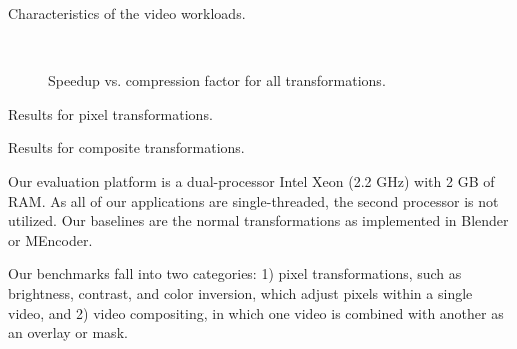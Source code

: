 \begin{table*}[t]

\vspace{-10pt}
\caption{Characteristics of the video workloads.
\protect\label{tab:videos}}
\vspace{6pt}
\end{table*}

\begin{figure}[t]
\begin{center}
\mbox{~}

\vspace{-10pt}
\caption{Speedup vs. compression factor for all transformations.
\protect\label{fig:speedup-scatter}}
\vspace{-12pt}
\end{center}
\end{figure}

\begin{table*}[t]
\vspace{-10pt}
\hspace{-0.505in}

\vspace{-10pt}
\caption{Results for pixel transformations.
\protect\label{tab:pixel-speedup}}
\vspace{12pt}
\end{table*}

\begin{table*}[t]

\vspace{-10pt}
\caption{Results for composite transformations.
\protect\label{tab:composite-speedup}}
\vspace{6pt}
\end{table*}

Our evaluation platform is a dual-processor Intel Xeon (2.2 GHz) with
2 GB of RAM.  As all of our applications are single-threaded, the
second processor is not utilized.  
Our baselines are the normal transformations as implemented in Blender
or MEncoder.

Our benchmarks fall into two categories: 1) pixel transformations,
such as brightness, contrast, and color inversion, which adjust pixels
within a single video, and 2) video compositing, in which one video is
combined with another as an overlay or mask.

